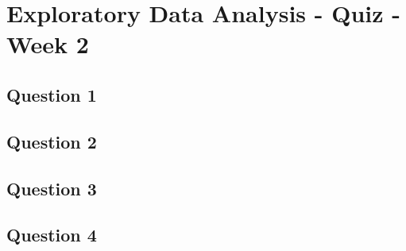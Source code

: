 \documentclass[french]{article}
\begin{document}
\section*{Exploratory Data Analysis - Quiz - Week 2}
\subsection*{Question 1}

\newpage
\subsection*{Question 2}


\newpage
\subsection*{Question 3}

\newpage
\subsection*{Question 4}
\end{document}
